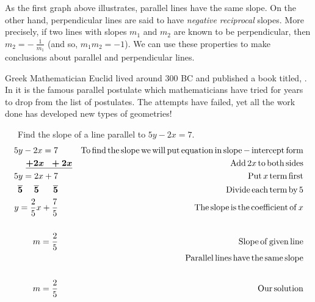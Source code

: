  As the first graph above illustrates, parallel lines have the same slope.\pp
On the other hand, perpendicular lines are said to have \textit{negative reciprocal} slopes.   More precisely, if two lines with slopes $m_1$ and $m_2$ are known to be perpendicular, then $m_2=-~\displaystyle\frac{1}{m_1}$ (and so, $m_1m_2=-1$).\pp
We can use these properties to make conclusions about parallel and perpendicular lines.\pp

{} Greek Mathematician Euclid lived around 300 BC
and published a book titled, {}. In it is the famous
parallel postulate which mathematicians have tried for years to drop from the
list of postulates. The attempts have failed, yet all the work done has
developed new types of geometries!\pp

\begin{example}\label{Lin69}~~~Find the slope of a line parallel to $5 y - 2 x = 7$.
  \begin{eqnarray*}
    5 y - 2 x = 7~~~~~ &  & \operatorname{To} \operatorname{find} \operatorname{the} \operatorname{slope} \operatorname{we}
    \operatorname{will} \operatorname{put} \operatorname{equation} \operatorname{in} \operatorname{slope} -
    \operatorname{intercept} \operatorname{form}\\
    \boldsymbol{\underline{+ 2 x ~~ + 2 x}} &  & \operatorname{Add} 2 x \operatorname{to} \operatorname{both}
    \operatorname{sides}\\
    5 y = 2 x + 7~~~~~ &  & \operatorname{Put} x \operatorname{term} \operatorname{first}\\
    \boldsymbol{\overline{5} ~~~~ \overline{5} ~~~~~ \overline{5}}~~~~~ &  & \operatorname{Divide} \operatorname{each}
    \operatorname{term} \operatorname{by} 5\\
    y = \frac{2}{5} x + \frac{7}{5}~~~~~ &  & \operatorname{The} \operatorname{slope} \operatorname{is}
    \operatorname{the} \operatorname{coefficient} \operatorname{of} x\\
    &  & \\
    m = \frac{2}{5}~~~~~ &  & \operatorname{Slope} \operatorname{of} \operatorname{given} \operatorname{line}\\
		& & \operatorname{Parallel} \operatorname{lines} \operatorname{have} \operatorname{the} \operatorname{same}
    \operatorname{slope}\\
    &  & \\
    m = \frac{2}{5}~~~~~ &  & \operatorname{Our} \operatorname{solution}
  \end{eqnarray*}
\end{example}


